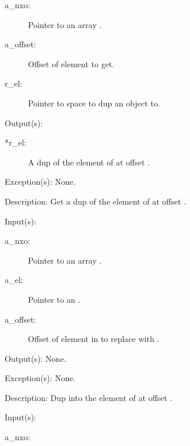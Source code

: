 \begin{capi}
\begin{capilist}
\begin{description}
		\item[a\_nxo: ]
			Pointer to an array .
		\item[a\_offset: ]
			Offset of element to get.
		\item[r\_el: ]
			Pointer to space to dup an object to.
		\end{description}
	\item[Output(s): ]
		\begin{description}\item[]
		\item[*r\_el: ]
			A dup of the element of  at offset
			.
		\end{description}
	\item[Exception(s): ] None.
	\item[Description: ]
		Get a dup of the element of  at offset
		.
	\end{capilist}
\label{nxo_array_el_set}
	\begin{capilist}
	\item[Input(s): ]
		\begin{description}\item[]
		\item[a\_nxo: ]
			Pointer to an array .
		\item[a\_el: ]
			Pointer to an .
		\item[a\_offset: ]
			Offset of element in  to replace with
			.
		\end{description}
	\item[Output(s): ] None.
	\item[Exception(s): ] None.
	\item[Description: ]
		Dup  into the element of  at offset
		.
	\end{capilist}
\label{nxo_array_origin_get}
	\begin{capilist}
	\item[Input(s): ]
		\begin{description}\item[]
		\item[a\_nxo: ]

\end{description}
\end{capilist}
\end{capi}
